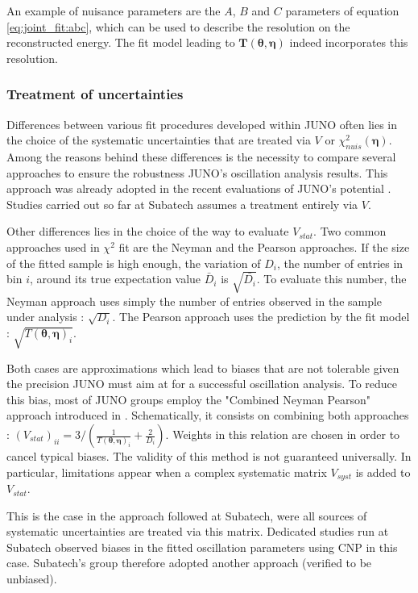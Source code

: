 \documentclass[../main.tex]{subfiles}
\begin{document}
An example of nuisance parameters are the $A$, $B$ and $C$ parameters of equation \ref{eq:joint_fit:abc}, which can be used to describe the resolution on the reconstructed energy. The fit model leading to $\bm{T}\left(\bm{\theta},\bm{\eta}\right)$ indeed incorporates this resolution.

\subsubsection{Treatment of uncertainties}

Differences between various fit procedures developed within JUNO often lies in the choice of the systematic uncertainties that are treated via $V$ or $\chi^2_{nuis}(\bm{\eta})$. Among the reasons behind these differences is the necessity to compare several approaches to ensure the robustness JUNO's oscillation analysis results. This approach was already adopted in the recent evaluations of JUNO's potential \cite{abusleme_potential_2024, juno_collaboration_sub-percent_2022}. Studies carried out so far at Subatech assumes a treatment entirely via $V$.

Other differences lies in the choice of the way to evaluate $V_{stat}$. Two common approaches used in $\chi^2$ fit are the Neyman and the Pearson approaches. If the size of the fitted sample is high enough, the variation of $D_i$, the number of entries in bin $i$, around its true expectation value $\bar{D}_i$ is $\sqrt{\bar{D_i}}$. To evaluate this number, the Neyman approach uses simply the number of entries observed in the sample under analysis : $\sqrt{D_i}$. The Pearson approach uses the prediction by the fit model : $\sqrt{T(\bm{\theta},\bm{\eta})_i}$.

Both cases are approximations which lead to biases that are not tolerable given the precision JUNO must aim at for a successful oscillation analysis. To reduce this bias, most of JUNO groups employ the "Combined Neyman Pearson" approach introduced in \cite{ji_combined_2019}. Schematically, it consists on combining both approaches :
$\left(V_{stat}\right)_{ii} = 3/\left(\frac{1}{T(\bm{\theta},\bm{\eta})_i}+\frac{2}{D_i}\right)$.
Weights in this relation are chosen in order to cancel typical biases. The validity of this method is not guaranteed universally. In particular, limitations appear when a complex systematic matrix $V_{syst}$ is added to $V_{stat}$.

This is the case in the approach followed at Subatech, were all sources of systematic uncertainties are treated via this matrix. Dedicated studies run at Subatech observed biases in the fitted oscillation parameters using CNP in this case. Subatech's group therefore adopted another approach (verified to be unbiased).
\end{document}
